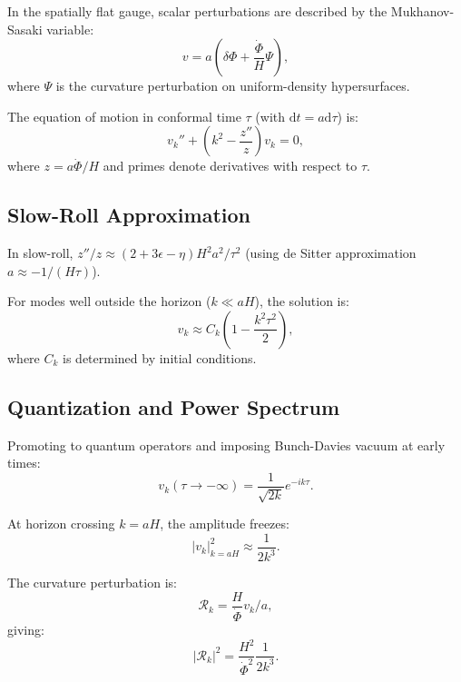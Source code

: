 \documentclass[11pt,a4paper]{article}
\numberwithin{equation}{section}
\theoremstyle{plain}
\theoremstyle{definition}
\theoremstyle{remark}
\newcommand{\dd}{\mathrm{d}}
\begin{document}
In the spatially flat gauge, scalar perturbations are described by the Mukhanov-Sasaki variable:
\begin{equation}
v = a\left(\delta\Phi + \frac{\dot{\Phi}}{H}\Psi\right),
\end{equation}
where $\Psi$ is the curvature perturbation on uniform-density hypersurfaces.

The equation of motion in conformal time $\tau$ (with $\dd t = a\dd\tau$) is:
\begin{equation}
v_k'' + \left(k^2 - \frac{z''}{z}\right)v_k = 0,
\label{eq:MS-equation}
\end{equation}
where $z = a\dot{\Phi}/H$ and primes denote derivatives with respect to $\tau$.

\subsection{Slow-Roll Approximation}

In slow-roll, $z''/z \approx (2 + 3\epsilon - \eta)H^2a^2/\tau^2$ (using de Sitter approximation $a \approx -1/(H\tau)$).

For modes well outside the horizon ($k \ll aH$), the solution is:
\begin{equation}
v_k \approx C_k\left(1 - \frac{k^2\tau^2}{2}\right),
\end{equation}
where $C_k$ is determined by initial conditions.

\subsection{Quantization and Power Spectrum}

Promoting to quantum operators and imposing Bunch-Davies vacuum at early times:
\begin{equation}
v_k(\tau\to -\infty) = \frac{1}{\sqrt{2k}}e^{-ik\tau}.
\end{equation}

At horizon crossing $k = aH$, the amplitude freezes:
\begin{equation}
|v_k|^2_{k=aH} \approx \frac{1}{2k^3}.
\end{equation}

The curvature perturbation is:
\begin{equation}
\mathcal{R}_k = \frac{H}{\dot{\Phi}}v_k/a,
\end{equation}
giving:
\begin{equation}
|\mathcal{R}_k|^2 = \frac{H^2}{\dot{\Phi}^2}\frac{1}{2k^3}.
\end{equation}
\end{document}
